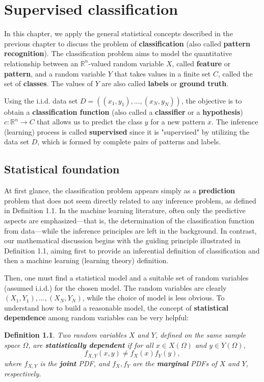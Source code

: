 \documentclass{report}
\newtheorem{definition}{Definition}[chapter]
\begin{document}
\chapter{Supervised classification}
In this chapter, we apply the general statistical concepts described in the previous chapter to discuss the problem of \textbf{classification} (also called \textbf{pattern recognition}). The classification problem aims to model the quantitative relationship between an $\mathbb{R}^n$-valued random variable $X$, called \textbf{feature} or \textbf{pattern}, and a random variable $Y$ that takes values in a finite set $C$, called the set of \textbf{classes}. The values of $Y$ are also called \textbf{labels} or \textbf{ground truth}.

Using the i.i.d. data set $D = ((x_1,y_1),\dots,(x_N,y_N))$, the objective is to obtain a \textbf{classification function} (also called a \textbf{classifier} or a \textbf{hypothesis}) $c : \mathbb{R}^n \to C$ that allows us to predict the class $y$ for a new pattern $x$. The inference (learning) process is called \textbf{supervised} since it is "supervised" by utilizing the data set $D$, which is formed by complete pairs of patterns and labels.

\section{Statistical foundation}
At first glance, the classification problem appears simply as a \textbf{prediction} problem that does not seem directly related to any inference problem, as defined in Definition 1.1. In the machine learning literature, often only the predictive aspects are emphasized—that is, the determination of the classification function from data—while the inference principles are left in the background. In contrast, our mathematical discussion begins with the guiding principle illustrated in Definition 1.1, aiming first to provide an inferential definition of classification and then a machine learning (learning theory) definition.

Then, one must find a statistical model and a suitable set of random variables (assumed i.i.d.) for the chosen model. The random variables are clearly $(X_1,Y_1),\dots,(X_N,Y_N)$, while the choice of model is less obvious. To understand how to build a reasonable model, the concept of \textbf{statistical dependence} among random variables can be very helpful:

\begin{definition}
Two random variables $X$ and $Y$, defined on the same sample space $\Omega$, are \textbf{statistically dependent} if for all $x\in X(\Omega)$ and $y \in Y(\Omega)$,
\begin{equation}
f_{X,Y}(x,y) \neq f_X(x)f_Y(y),
\end{equation}
where $f_{X,Y}$ is the \textbf{joint} PDF, and $f_X,f_Y$ are the \textbf{marginal} PDFs of $X$ and $Y$, respectively.
\end{definition}
\end{document}
